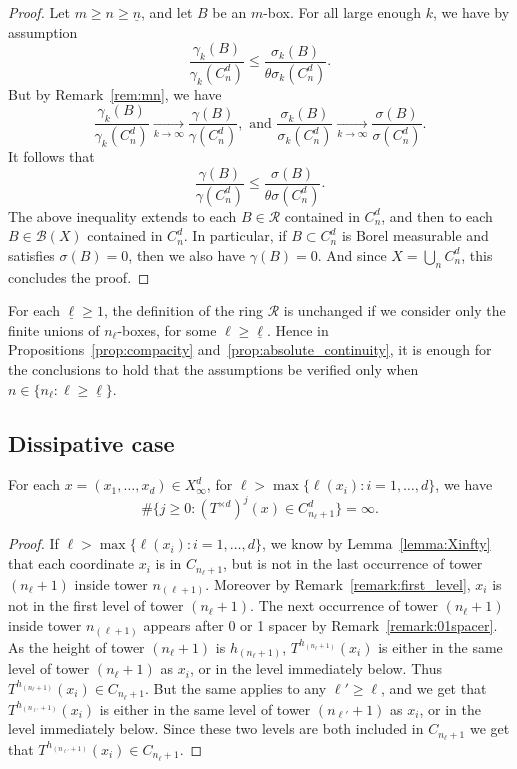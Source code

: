 \documentclass[AHL,Unicode,longabstracts]{cedram}
\newcommand{\tend}[3][]{\xrightarrow[#2\to#3]{#1}}
\newcommand{\cd}{C^{d}}
\newcommand{\td}{T^{\times d}}
\newcommand{\lb}{\underline{\ell}}
\begin{document}
\begin{proof}
Let $m\ge n\ge \underline{n}$, and let $B$ be an $m$-box. For all large enough $k$, we have by assumption
\[
\frac{\gamma_k(B)}{\gamma_k(\cd_n)} \le
\frac{\sigma_k(B)}{\theta\sigma_k(\cd_n)}.
\]
But by Remark~\ref{rem:mn}, we have
\[
\frac{\gamma_k(B)}{\gamma_k(\cd_n)} \tend{k}{\infty}
\frac{\gamma(B)}{\gamma(\cd_n)},\text{ and }
\frac{\sigma_k(B)}{\sigma_k(\cd_n)} \tend{k}{\infty}
\frac{\sigma(B)}{\sigma(\cd_n)}.
\]
It follows that
\[
\frac{\gamma(B)}{\gamma(\cd_n)} \le \frac{\sigma(B)}{\theta\sigma(\cd_n)}.
\]
The above inequality extends to each $B\in\mathscr{R}$ contained in $\cd_n$, and then to each $B\in\mathscr{B}(X)$ contained in $\cd_n$. In particular, if $B\subset \cd_n$ is Borel measurable and satisfies $\sigma(B)=0$, then we also have $\gamma(B)=0$. And since $X=\bigcup_n \cd_n$, this concludes the proof.
\end{proof}


\begin{rema}
For each $\lb\ge1$, the definition of the ring $\mathscr{R}$ is unchanged if we consider only the finite unions of $n_\ell$-boxes, for some $\ell\ge\lb$. Hence in Propositions~\ref{prop:compacity} and~\ref{prop:absolute_continuity}, it is enough for the conclusions to hold that the assumptions be verified only when $n\in\{n_\ell:\ell\ge\lb\}$.
\end{rema}

\subsection{Dissipative case}\label{sec:dissipative}
\begin{lemm}\label{lemma:dissipative_case}
For each $x=(x_1,\ldots,x_d)\in X_\infty^d$, for $\ell >
\max\{\ell(x_i):i=1,\ldots,d\}$, we have
\[
\#\{j\ge0: (\td)^j(x)\in C_{n_\ell + 1}^d\} = \infty.
\]
\end{lemm}
\begin{proof}
If $\ell> \max\{\ell(x_i):i=1,\ldots,d\}$, we know by Lemma~\ref{lemma:Xinfty} that each coordinate $x_i$ is in $C_{n_\ell + 1}$, but is not in the last occurrence of tower $(n_\ell+1)$ inside tower $n_{(\ell+1)}$. Moreover by Remark~\ref{remark:first_level}, $x_i$ is not in the first level of tower $(n_\ell+1)$. The next occurrence of tower $(n_\ell+1)$ inside tower $n_{(\ell+1)}$ appears after 0 or 1 spacer by Remark~\ref{remark:01spacer}. As the height of tower $(n_\ell+1)$ is $h_{(n_\ell+1)}$, $T^{h_{(n_\ell+1)}}(x_i)$ is either in the same level of tower $(n_\ell+1)$ as $x_i$, or in the level immediately below. Thus $T^{h_{(n_\ell+1)}}(x_i)\in C_{n_\ell + 1}$. But the same applies to any $\ell'\ge \ell$, and we get that $T^{h_{(n_{\ell'}+1)}}(x_i)$ is either in the same level of tower $(n_{\ell'}+1)$ as $x_i$, or in the level immediately below. Since these two levels are both included in $C_{n_\ell + 1}$ we get that $T^{h_{(n_{\ell'}+1)}}(x_i)\in C_{n_\ell + 1}$.
\end{proof}
\end{document}
